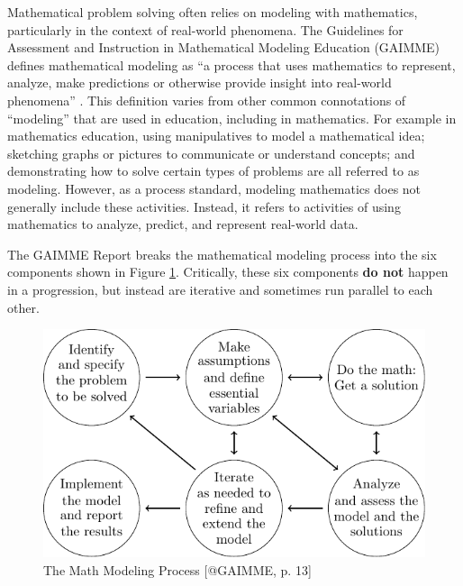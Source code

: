 \documentclass[
]{book}
\theoremstyle{definition}
\theoremstyle{definition}
\theoremstyle{definition}
\theoremstyle{definition}
\theoremstyle{remark}
\begin{document}
Mathematical problem solving often relies on modeling with mathematics, particularly in the context of real-world phenomena. The Guidelines for Assessment and Instruction in Mathematical Modeling Education (GAIMME) defines mathematical modeling as ``a process that uses mathematics to represent, analyze, make predictions or otherwise provide insight into real-world phenomena'' \citep[p.~8]{GAIMME}. This definition varies from other common connotations of ``modeling'' that are used in education, including in mathematics. For example in mathematics education, using manipulatives to model a mathematical idea; sketching graphs or pictures to communicate or understand concepts; and demonstrating how to solve certain types of problems are all referred to as modeling. However, as a process standard, modeling mathematics does not generally include these activities. Instead, it refers to activities of using mathematics to analyze, predict, and represent real-world data.

The GAIMME Report breaks the mathematical modeling process into the six components shown in Figure \ref{fig:GAIMME}. Critically, these six components \textbf{do not} happen in a progression, but instead are iterative and sometimes run parallel to each other.

\begin{figure}

{\centering \includegraphics[width=0.7\linewidth]{tikz/GAIMME} 

}

\caption{The Math Modeling Process [@GAIMME, p. 13]}\label{fig:GAIMME}
\end{figure}
\end{document}
